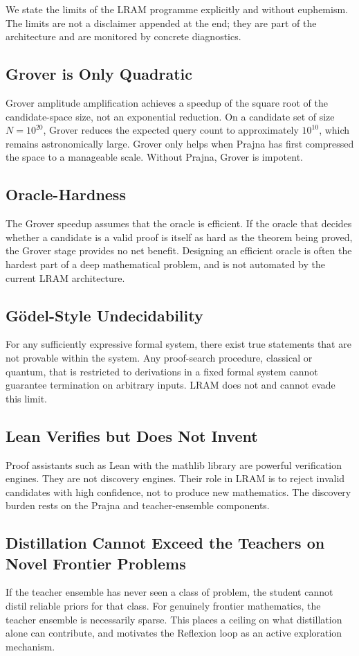 We state the limits of the LRAM programme explicitly and without euphemism. The limits are not a disclaimer appended at the end; they are part of the architecture and are monitored by concrete diagnostics.

\subsection{Grover is Only Quadratic}
Grover amplitude amplification achieves a speedup of the square root of the candidate-space size, not an exponential reduction. On a candidate set of size $N = 10^{20}$, Grover reduces the expected query count to approximately $10^{10}$, which remains astronomically large. Grover only helps when Prajna has first compressed the space to a manageable scale. Without Prajna, Grover is impotent.

\subsection{Oracle-Hardness}
The Grover speedup assumes that the oracle is efficient. If the oracle that decides whether a candidate is a valid proof is itself as hard as the theorem being proved, the Grover stage provides no net benefit. Designing an efficient oracle is often the hardest part of a deep mathematical problem, and is not automated by the current LRAM architecture.

\subsection{Gödel-Style Undecidability}
For any sufficiently expressive formal system, there exist true statements that are not provable within the system. Any proof-search procedure, classical or quantum, that is restricted to derivations in a fixed formal system cannot guarantee termination on arbitrary inputs. LRAM does not and cannot evade this limit.

\subsection{Lean Verifies but Does Not Invent}
Proof assistants such as Lean with the mathlib library are powerful verification engines. They are not discovery engines. Their role in LRAM is to reject invalid candidates with high confidence, not to produce new mathematics. The discovery burden rests on the Prajna and teacher-ensemble components.

\subsection{Distillation Cannot Exceed the Teachers on Novel Frontier Problems}
If the teacher ensemble has never seen a class of problem, the student cannot distil reliable priors for that class. For genuinely frontier mathematics, the teacher ensemble is necessarily sparse. This places a ceiling on what distillation alone can contribute, and motivates the Reflexion loop as an active exploration mechanism.

